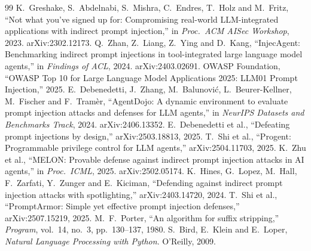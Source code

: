 \begin{thebibliography}{99}\footnotesize\setlength{\itemsep}{0pt}
 K.~Greshake, S.~Abdelnabi, S.~Mishra, C.~Endres, T.~Holz and M.~Fritz, ``Not what you've signed up for: Compromising real-world LLM-integrated applications with indirect prompt injection,'' in \emph{Proc.\ ACM AISec Workshop}, 2023. arXiv:2302.12173.
 Q.~Zhan, Z.~Liang, Z.~Ying and D.~Kang, ``InjecAgent: Benchmarking indirect prompt injections in tool-integrated large language model agents,'' in \emph{Findings of ACL}, 2024. arXiv:2403.02691.
 OWASP Foundation, ``OWASP Top 10 for Large Language Model Applications 2025: LLM01 Prompt Injection,'' 2025.
 E.~Debenedetti, J.~Zhang, M.~Balunovi\'c, L.~Beurer-Kellner, M.~Fischer and F.~Tram\`er, ``AgentDojo: A dynamic environment to evaluate prompt injection attacks and defenses for LLM agents,'' in \emph{NeurIPS Datasets and Benchmarks Track}, 2024. arXiv:2406.13352.
 E.~Debenedetti et al., ``Defeating prompt injections by design,'' arXiv:2503.18813, 2025.
 T.~Shi et al., ``Progent: Programmable privilege control for LLM agents,'' arXiv:2504.11703, 2025.
 K.~Zhu et al., ``MELON: Provable defense against indirect prompt injection attacks in AI agents,'' in \emph{Proc.\ ICML}, 2025. arXiv:2502.05174.
 K.~Hines, G.~Lopez, M.~Hall, F.~Zarfati, Y.~Zunger and E.~Kiciman, ``Defending against indirect prompt injection attacks with spotlighting,'' arXiv:2403.14720, 2024.
 T.~Shi et al., ``PromptArmor: Simple yet effective prompt injection defenses,'' arXiv:2507.15219, 2025.
 M.~F.~Porter, ``An algorithm for suffix stripping,'' \emph{Program}, vol.~14, no.~3, pp.~130--137, 1980.
 S.~Bird, E.~Klein and E.~Loper, \emph{Natural Language Processing with Python}. O'Reilly, 2009.
\end{thebibliography}
